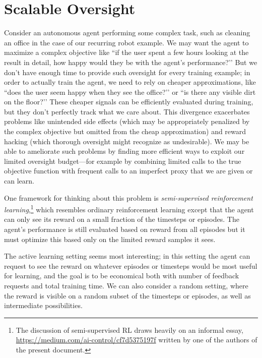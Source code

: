 \documentclass[a4paper,10pt]{article}
\begin{document}
\section{Scalable Oversight} \label{problem:ScalableOversight}

Consider an autonomous agent performing some complex task, such as cleaning an office in the case of our recurring robot example.  We may want the agent to maximize a complex objective like ``if the user spent a few hours looking at the result in detail, how happy would they be with the agent’s performance?’’ But we don’t have enough time to provide such oversight for every training example; in order to actually train the agent, we need to rely on cheaper approximations, like ``does the user seem happy when they see the office?’’ or ``is there any visible dirt on the floor?’’ These cheaper signals can be efficiently evaluated during training, but they don’t perfectly track what we care about. This divergence exacerbates problems like unintended side effects (which may be appropriately penalized by the complex objective but omitted from the cheap approximation) and reward hacking (which thorough oversight might recognize as undesirable).  We may be able to ameliorate such problems by finding more efficient ways to exploit our limited oversight budget---for example by combining limited calls to the true objective function with frequent calls to an imperfect proxy that we are given or can learn.

One framework for thinking about this problem is \emph{semi-supervised reinforcement learning},\footnote{The discussion of semi-supervised RL draws heavily on an informal essay, \url{https://medium.com/ai-control/cf7d5375197f} written by one of the authors of the present document.} which resembles ordinary reinforcement learning except that the agent can only see its reward on a small fraction of the timesteps or episodes.  The agent’s performance is still evaluated based on reward from all episodes but it must optimize this based only on the limited reward samples it sees.

The active learning setting seems most interesting; in this setting the agent can request to see the reward on whatever episodes or timesteps would be most useful for learning, and the goal is to be economical both with number of feedback requests and total training time. We can also consider a random setting, where the reward is visible on a random subset of the timesteps or episodes, as well as intermediate possibilities. 
\end{document}
